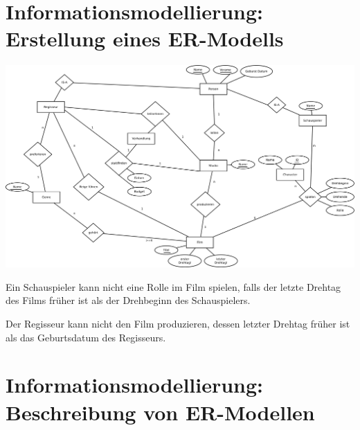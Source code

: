 \documentclass[ngerman]{gdb-aufgabenblatt}
\begin{document}
\section{Informationsmodellierung: Erstellung eines ER-Modells}

\centerline{\includegraphics[scale=0.2]{Aufgabe1HA2.pdf}} \par 
\begin{compactenum}[(i)]
	\item Ein Schauspieler kann nicht eine Rolle im Film spielen, falls der letzte Drehtag des Films fr\"uher ist als der Drehbeginn des Schauspielers. \\
	\item Der Regisseur kann nicht den Film produzieren, dessen letzter Drehtag fr\"uher ist als das Geburtsdatum des Regisseurs.\\
\end{compactenum}


\section{Informationsmodellierung: Beschreibung von ER-Modellen}
\end{document}
